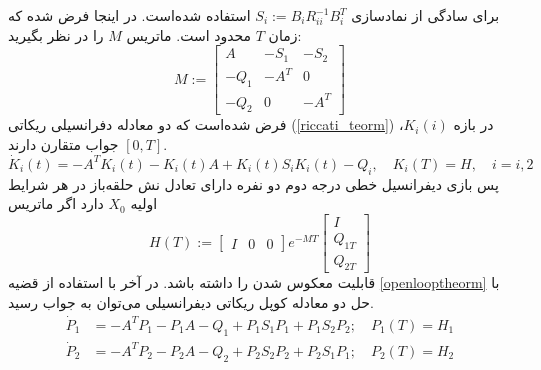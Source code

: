برای سادگی از نمادسازی 
$S_i := B_iR^{-1}_{ii}B_i^T$
استفاده شده‌است. در اینجا فرض شده که زمان $T$ محدود است.
 \label{openlooptheorm}
ماتریس $M$ را در نظر بگیرید:
\begin{equation}
	M :=
	\begin{bmatrix}
		A & -S_1 & -S_2\\
		-Q_1 & -A^T& 0\\
		-Q_2 & 0 & -A^T
	\end{bmatrix}
\end{equation}
فرض شده‌است که دو معادله دفرانسیلی ریکاتی
(\ref{riccati_teorm})
،$K_i(i)$
در بازه
$[0, T]$
جواب متقارن دارند.
\begin{equation}\label{riccati_teorm}
	\dot{K}_i(t) = -A^TK_i(t)-K_i(t)A+K_i(t)S_iK_i(t)-Q_i,\quad K_i(T) = H,\quad i = i, 2
\end{equation}
\newpage
پس بازی دیفرانسیل خطی درجه دوم دو نفره دارای تعادل نش حلقه‌باز در هر شرایط اولیه $X_0
$
دارد اگر ماتریس
\begin{equation}
	H(T) := \begin{bmatrix}
		I&0&0
	\end{bmatrix}
e^{-MT}
\begin{bmatrix}
	I\\Q_{1T}\\Q_{2T}
\end{bmatrix}
\end{equation}
قابلیت معکوس شدن را  داشته‌ باشد.
در آخر با استفاده از قضیه
 \ref{openlooptheorm}
با حل دو معادله کوپل ریکاتی دیفرانسیلی می‌توان به جواب رسید.
\begin{align}
	\dot{P}_1 &= -A^TP_1 - P_1A - Q_1 +P_1S_1P_1 + P_1S_2P_2;\quad P_1(T) = H_1\\
	\dot{P}_2 &= -A^TP_2 - P_2A - Q_2 +P_2S_2P_2 + P_2S_1P_1;\quad P_2(T) = H_2
\end{align}

